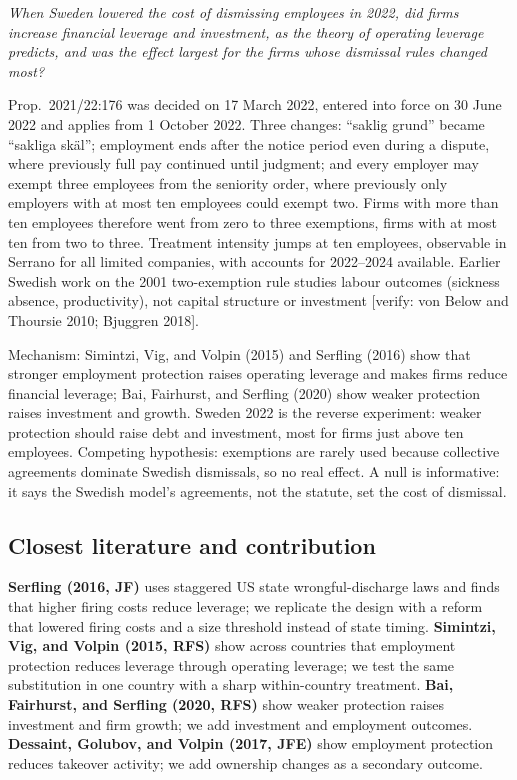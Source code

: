 \documentclass[12pt,a4paper]{article}
\begin{document}
\emph{When Sweden lowered the cost of dismissing employees in 2022, did firms increase financial leverage and investment, as the theory of operating leverage predicts, and was the effect largest for the firms whose dismissal rules changed most?}

Prop.\ 2021/22:176 was decided on 17 March 2022, entered into force on 30 June 2022 and applies from 1 October 2022. Three changes: ``saklig grund'' became ``sakliga skäl''; employment ends after the notice period even during a dispute, where previously full pay continued until judgment; and every employer may exempt three employees from the seniority order, where previously only employers with at most ten employees could exempt two. Firms with more than ten employees therefore went from zero to three exemptions, firms with at most ten from two to three. Treatment intensity jumps at ten employees, observable in Serrano for all limited companies, with accounts for 2022--2024 available. Earlier Swedish work on the 2001 two-exemption rule studies labour outcomes (sickness absence, productivity), not capital structure or investment [verify: von Below and Thoursie 2010; Bjuggren 2018].

Mechanism: Simintzi, Vig, and Volpin (2015) and Serfling (2016) show that stronger employment protection raises operating leverage and makes firms reduce financial leverage; Bai, Fairhurst, and Serfling (2020) show weaker protection raises investment and growth. Sweden 2022 is the reverse experiment: weaker protection should raise debt and investment, most for firms just above ten employees. Competing hypothesis: exemptions are rarely used because collective agreements dominate Swedish dismissals, so no real effect. A null is informative: it says the Swedish model's agreements, not the statute, set the cost of dismissal.

\subsection{Closest literature and contribution}

\textbf{Serfling (2016, JF)} uses staggered US state wrongful-discharge laws and finds that higher firing costs reduce leverage; we replicate the design with a reform that lowered firing costs and a size threshold instead of state timing. \textbf{Simintzi, Vig, and Volpin (2015, RFS)} show across countries that employment protection reduces leverage through operating leverage; we test the same substitution in one country with a sharp within-country treatment. \textbf{Bai, Fairhurst, and Serfling (2020, RFS)} show weaker protection raises investment and firm growth; we add investment and employment outcomes. \textbf{Dessaint, Golubov, and Volpin (2017, JFE)} show employment protection reduces takeover activity; we add ownership changes as a secondary outcome.
\end{document}
